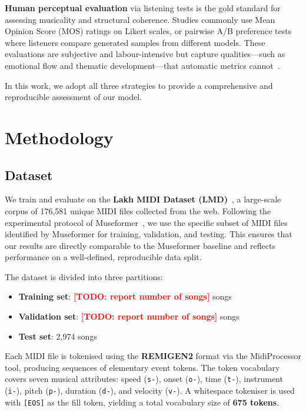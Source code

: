 \documentclass[conference]{IEEEtran}
\newcommand{\TODO}[1]{\textcolor{red}{\textbf{[TODO: #1]}}}
\begin{document}
\textbf{Human perceptual evaluation} via listening tests is the gold
standard for assessing musicality and structural coherence. Studies
commonly use Mean Opinion Score (MOS) ratings on Likert scales, or
pairwise A/B preference tests where listeners compare generated samples
from different models. These evaluations are subjective and
labour-intensive but capture qualities—such as emotional flow and
thematic development—that automatic metrics cannot~\cite{chen2024eval}.

In this work, we adopt all three strategies to provide a comprehensive
and reproducible assessment of our model.

\section{Methodology}
\label{sec:method}

\subsection{Dataset}
\label{ssec:dataset}

We train and evaluate on the \textbf{Lakh MIDI Dataset
(LMD)}~\cite{raffel2016}, a large-scale corpus of 176,581 unique MIDI
files collected from the web. Following the experimental protocol of
Museformer~\cite{yu2022}, we use the specific subset of MIDI files
identified by Museformer for training, validation, and testing. This
ensures that our results are directly comparable to the Museformer
baseline and reflects performance on a well-defined, reproducible data
split.

The dataset is divided into three partitions:
\begin{itemize}
    \item \textbf{Training set}: \TODO{report number of songs} songs
    \item \textbf{Validation set}: \TODO{report number of songs} songs
    \item \textbf{Test set}: 2,974 songs
\end{itemize}

Each MIDI file is tokenised using the \textbf{REMIGEN2} format via the
MidiProcessor tool, producing sequences of elementary event tokens. The
token vocabulary covers seven musical attributes: speed (\texttt{s-}),
onset (\texttt{o-}), time (\texttt{t-}), instrument (\texttt{i-}),
pitch (\texttt{p-}), duration (\texttt{d-}), and velocity (\texttt{v-}).
A whitespace tokeniser is used with \texttt{[EOS]} as the fill token,
yielding a total vocabulary size of \textbf{675 tokens}.
\end{document}
